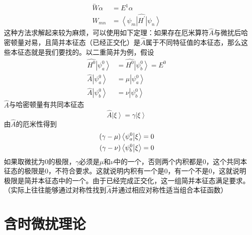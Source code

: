 \documentclass[12pt, a4paper, oneside]{ctexart}
\begin{document}
	\begin{align}
		\overleftrightarrow{W}\alpha&=E^{1}\alpha\\
		W_{mn}&=\left<\psi_{m}\right|\hat{H^{\prime}}\left|\psi_{n}\right>
	\end{align}
	\quad\quad 这种方法求解起来较为麻烦，可以使用如下定理：如果存在厄米算符$\hat{A}$与微扰后哈密顿量对易，且简并本征态（已经正交化）是$\hat{A}$属于不同特征值的本征态，那么这些本征态就是我们要找的。以二重简并为例，假设
	\begin{align}
		\hat{H^{0}}\left|\psi_{a}^{0}\right>&=\hat{H^{0}}\left|\psi_{b}^{0}\right>=E^{0}\\
		\hat{A}\left|\psi_{a}^{0}\right>&=\mu\left|\psi_{a}^{0}\right>\\
		\hat{A}\left|\psi_{b}^{0}\right>&=\nu\left|\psi_{b}^{0}\right>
	\end{align}
	\quad\quad $\hat{A}$与哈密顿量有共同本征态
	\begin{equation}
		\hat{A}\left|\xi\right>=\gamma\left|\xi\right>
	\end{equation}
	\quad\quad 由$\hat{A}$的厄米性得到
	\begin{align}
		(\gamma-\mu)\left<\psi_{a}^{0}\big{|}\xi\right>&=0\\
		(\gamma-\nu)\left<\psi_{b}^{0}\big{|}\xi\right>&=0
	\end{align}
	\quad\quad 如果取微扰为$0$的极限，$\gamma$必须是$\mu$和$\nu$中的一个，否则两个内积都是$0$，这个共同本征态的极限是$0$，不符合要求。这就说明内积有一个是$0$，有一个不是$0$，这就说明极限是简并本征态中的一个。由于已经完成正交化，这一组简并本征态满足要求。（实际上往往能够通过对称性找到$\hat{A}$并通过相应对称性适当组合本征函数）
	\section{含时微扰理论}
	
\end{document}
